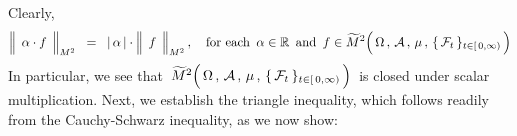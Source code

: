\proof
Clearly,
\begin{equation*}
\left\Vert\;\, \alpha\cdot\overset{{\color{white}.}}{f} \,\;\right\Vert_{M^{2}}
\;\; = \;\;
	\vert\,\alpha\,\vert \cdot \left\Vert\;\, \overset{{\color{white}}}{f} \,\;\right\Vert_{M^{2}},
\quad
\textnormal{for each \,$\alpha \in \Re$\, and \,$f \in \widetilde{M}^{2}\!\left(\,
	\overset{{\color{white}.}}{\Omega} \,,\, \mathcal{A} \,,\, \mu \,,\, \{\,\mathcal{F}_{t}\,\}_{t \in [\,0,\infty)}
	\,\right)$}
\end{equation*}
In particular, we see that
\,$\widetilde{M}^{2}\!\left(\,
	\overset{{\color{white}.}}{\Omega} \,,\, \mathcal{A} \,,\, \mu \,,\, \{\,\mathcal{F}_{t}\,\}_{t \in [\,0,\infty)}
	\,\right)$\,
is closed under scalar multiplication.
Next, we establish the triangle inequality,
which follows readily from the Cauchy-Schwarz inequality, as we now show:

